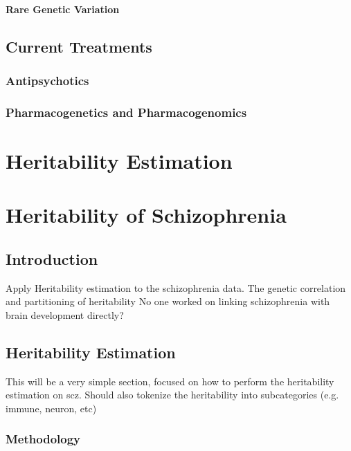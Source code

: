 \documentclass{book}
\begin{document}
	\subsubsection{Rare Genetic Variation}
	\section{Current Treatments}
	\subsection{Antipsychotics}
	\subsection{Pharmacogenetics and Pharmacogenomics}
	
	\chapter{Heritability Estimation}
	
	
	\chapter{Heritability of Schizophrenia}
	\section{Introduction}
	Apply Heritability estimation to the schizophrenia data.
	The genetic correlation and partitioning of heritability
	No one worked on linking schizophrenia with brain development directly?
	\section{Heritability Estimation}
	This will be a very simple section, focused on how to perform the heritability estimation on \acrfull{scz}.
	Should also tokenize the heritability into subcategories (e.g. immune, neuron, etc)
	
	
	\subsection{Methodology}
\end{document}

